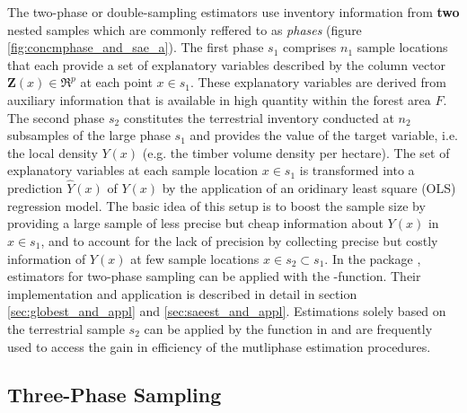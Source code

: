 \documentclass[article]{jss}
\begin{document}
The two-phase or double-sampling estimators use inventory information from \textbf{two} nested samples which are commonly reffered to as \textit{phases} (figure \ref{fig:concmphase_and_sae_a}). The first phase $s_1$ comprises $n_1$ sample locations that each provide a set of explanatory variables described by the column vector $\pmb{Z}(x)\in{\Re^{p}}$ at each point $x \in s_1$. These explanatory variables are derived from auxiliary information that is available in high quantity within the forest area $F$. The second phase $s_2$ constitutes the terrestrial inventory conducted at $n_2$ subsamples of the large phase $s_1$ and provides the value of the target variable, i.e. the local density $Y(x)$ (e.g. the timber volume density per hectare). The set of explanatory variables at each sample location $x \in s_1$ is transformed into a prediction $\hat{Y}(x)$ of $Y(x)$ by the application of an oridinary least square (OLS) regression model. The basic idea of this setup is to boost the sample size by providing a large sample of less precise but cheap information about $Y(x)$ in $x \in s_1$, and to account for the lack of precision by collecting precise but costly information of $Y(x)$ at few sample locations $x \in s_2 \subset s_1$. In the  package , estimators for two-phase sampling can be applied with the -function. Their implementation and application is described in detail in section \ref{sec:globest_and_appl} and \ref{sec:saeest_and_appl}. Estimations solely based on the terrestrial sample $s_2$ can be applied by the  function in  and are frequently used to access the gain in efficiency of the mutliphase estimation procedures. 


\subsection{Three-Phase Sampling}
\end{document}
